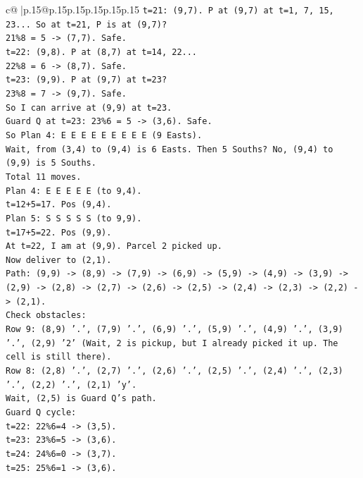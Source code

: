 \documentclass{article}
\begin{document}
{\begin{supertabular}{c@{$\;$}|p{.15\linewidth}@{}p{.15\linewidth}p{.15\linewidth}p{.15\linewidth}p{.15\linewidth}p{.15\linewidth}}
{{{\texttt{t=21: (9,7). P at (9,7) at t=1, 7, 15, 23... So at t=21, P is at (9,7)?} \\
\texttt{21\%8 = 5 {-}> (7,7). Safe.} \\
\texttt{t=22: (9,8). P at (8,7) at t=14, 22...} \\
\texttt{22\%8 = 6 {-}> (8,7). Safe.} \\
\texttt{t=23: (9,9). P at (9,7) at t=23?} \\
\texttt{23\%8 = 7 {-}> (9,7). Safe.} \\
\texttt{So I can arrive at (9,9) at t=23.} \\
\texttt{Guard Q at t=23: 23\%6 = 5 {-}> (3,6). Safe.} \\
\texttt{So Plan 4: E E E E E E E E E (9 Easts).} \\
\texttt{Wait, from (3,4) to (9,4) is 6 Easts. Then 5 Souths? No, (9,4) to (9,9) is 5 Souths.} \\
\texttt{Total 11 moves.} \\
\texttt{Plan 4: E E E E E (to 9,4).} \\
\texttt{t=12+5=17. Pos (9,4).} \\
\texttt{Plan 5: S S S S S (to 9,9).} \\
\texttt{t=17+5=22. Pos (9,9).} \\
\texttt{At t=22, I am at (9,9). Parcel 2 picked up.} \\
\texttt{Now deliver to (2,1).} \\
\texttt{Path: (9,9) {-}> (8,9) {-}> (7,9) {-}> (6,9) {-}> (5,9) {-}> (4,9) {-}> (3,9) {-}> (2,9) {-}> (2,8) {-}> (2,7) {-}> (2,6) {-}> (2,5) {-}> (2,4) {-}> (2,3) {-}> (2,2) {-}> (2,1).} \\
\texttt{Check obstacles:} \\
\texttt{Row 9: (8,9) '.', (7,9) '.', (6,9) '.', (5,9) '.', (4,9) '.', (3,9) '.', (2,9) '2' (Wait, 2 is pickup, but I already picked it up. The cell is still there).} \\
\texttt{Row 8: (2,8) '.', (2,7) '.', (2,6) '.', (2,5) '.', (2,4) '.', (2,3) '.', (2,2) '.', (2,1) 'y'.} \\
\texttt{Wait, (2,5) is Guard Q's path.} \\
\texttt{Guard Q cycle:} \\
\texttt{t=22: 22\%6=4 {-}> (3,5).} \\
\texttt{t=23: 23\%6=5 {-}> (3,6).} \\
\texttt{t=24: 24\%6=0 {-}> (3,7).} \\
\texttt{t=25: 25\%6=1 {-}> (3,6).} \\
}}}
\end{supertabular}}
\end{document}
